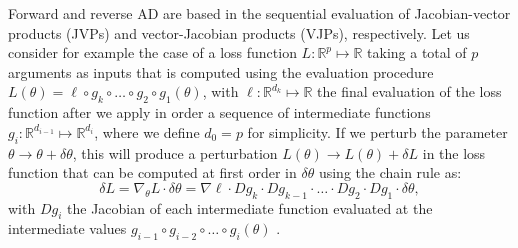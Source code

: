 
Forward and reverse AD are based in the sequential evaluation of Jacobian-vector products (JVPs) and vector-Jacobian products (VJPs), respectively. 
Let us consider for example the case of a loss function $L : \mathbb R^p \mapsto \mathbb R$ taking a total of $p$ arguments as inputs that is computed using the evaluation procedure $L(\theta) = \ell \circ g_{k} \circ \ldots \circ g_2 \circ g_1(\theta)$, with $\ell : \mathbb R^{d_k} \mapsto \mathbb R$ the final evaluation of the loss function after we apply in order a sequence of intermediate functions $g_i : \mathbb R^{d_{i-1}} \mapsto \mathbb R^{d_i}$, where we define $d_0 = p$ for simplicity. 
If we perturb the parameter $\theta \rightarrow \theta + \delta \theta$, this will produce a perturbation $L (\theta) \rightarrow L(\theta) + \delta L$ in the loss function that can be computed at first order in $\delta \theta$ using the chain rule as: 
\begin{equation}
     \delta L = \nabla_\theta L \cdot \delta \theta = \nabla \ell \cdot Dg_{k} \cdot Dg_{k-1} \cdot \ldots \cdot Dg_2 \cdot Dg_1 \cdot \delta \theta , 
    \label{eq:deltaL}
\end{equation}
with $Dg_i$ the Jacobian of each intermediate function evaluated at the intermediate values $g_{i-1} \circ g_{i-2} \circ \ldots \circ g_i (\theta)$ \cite{Giering_Kaminski_1998}.

